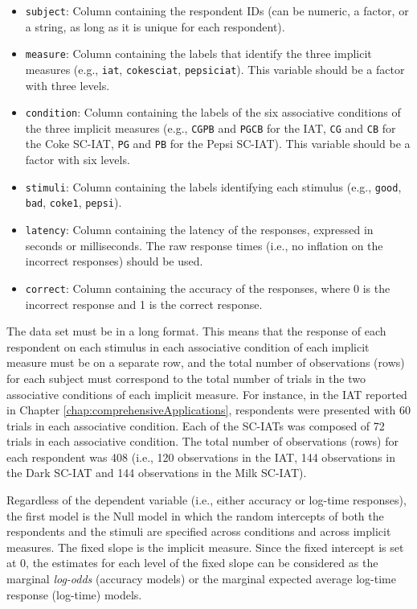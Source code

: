 \documentclass[12pt]{book}
\begin{document}
\begin{itemize}
	\item \texttt{subject}: Column containing the respondent IDs (can be numeric, a factor, or a string, as long as it is unique for each respondent).
	\item\texttt{measure}: Column containing the labels that identify the three implicit measures (e.g., \texttt{iat}, \texttt{cokesciat}, \texttt{pepsiciat}). This variable should be a factor with three levels.
	\item\texttt{condition}: Column containing the labels of the six associative conditions of the three implicit measures (e.g., \texttt{CGPB} and \texttt{PGCB} for the IAT, \texttt{CG} and \texttt{CB} for the Coke SC-IAT, \texttt{PG} and \texttt{PB} for the Pepsi SC-IAT). This variable should be a factor with six levels.
	\item \texttt{stimuli}: Column containing the labels identifying each stimulus (e.g., \texttt{good}, \texttt{bad}, \texttt{coke1}, \texttt{pepsi}).
	\item \texttt{latency}: Column containing the latency of the  responses, expressed in seconds or milliseconds. The raw response times (i.e., no inflation on the incorrect responses) should be used.
	\item \texttt{correct}: Column containing the accuracy of the responses, where 0 is the incorrect response and 1 is the correct response.
\end{itemize}

The data set must be in a long format. 
This means that the response of each respondent on each stimulus in each associative condition of each implicit measure must be on a separate row, and the total number of observations (rows) for each subject must correspond to the total number of trials in the two associative conditions of each implicit measure. 
For instance, in the IAT reported in Chapter \ref{chap:comprehensiveApplications}, respondents were presented with 60 trials in each associative condition. Each of the SC-IATs was composed of 72 trials in each associative condition. 
The total number of observations (rows) for each respondent was 408 (i.e., 120 observations in the IAT, 144 observations in the Dark SC-IAT and 144  observations in the Milk SC-IAT).  

Regardless of the dependent variable (i.e., either accuracy or log-time responses), the first model is the Null model in which the random intercepts of 
both the respondents and the stimuli are specified across conditions and across implicit measures. The fixed slope is the implicit measure. 
Since the fixed intercept is set at 0, the estimates for each level of the fixed slope can be considered as the marginal \emph{log-odds} (accuracy models) or the marginal expected average log-time response (log-time) models. 
\end{document}
